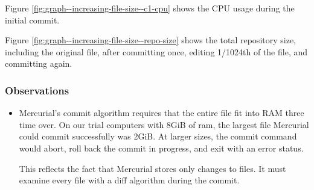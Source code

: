 \documentclass[a4paper]{article}
\begin{document}
Figure \ref{fig:graph--increasing-file-size--c1-cpu} shows the
CPU usage during the initial commit.

Figure \ref{fig:graph--increasing-file-size--repo-size} shows the total
repository size, including the original file, after committing once, editing
1/1024th of the file, and committing again.

\iffalse

\subsubsection{Observations}

\begin{itemize}

  \item Mercurial's commit algorithm requires that the entire file fit into RAM
    three time over. On our trial computers with 8GiB of ram, the largest file
    Mercurial could commit successfully was 2GiB. At larger sizes, the commit
    command would abort, roll back the commit in progress, and exit with an
    error status.

    This reflects the fact that Mercurial stores only changes to files. It must
    examine every file with a diff algorithm during the commit.

\end{itemize}

\end{document}
